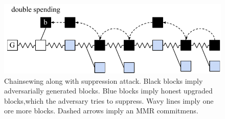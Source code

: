 	\begin{figure}
		\begin{center}
			\includegraphics[width=0.95\columnwidth]{figures/attack_after_update-crop.pdf}
		\end{center}
		\caption{Chainsewing along with suppression attack. Black blocks imply adversarially generated blocks. Blue blocks imply honest upgraded blocks,which the adversary tries to suppress. Wavy lines imply one ore more blocks. Dashed arrows imply an MMR commitmens.}
		\label{fig:combined_chainsewing_flyclient}
	\end{figure}
